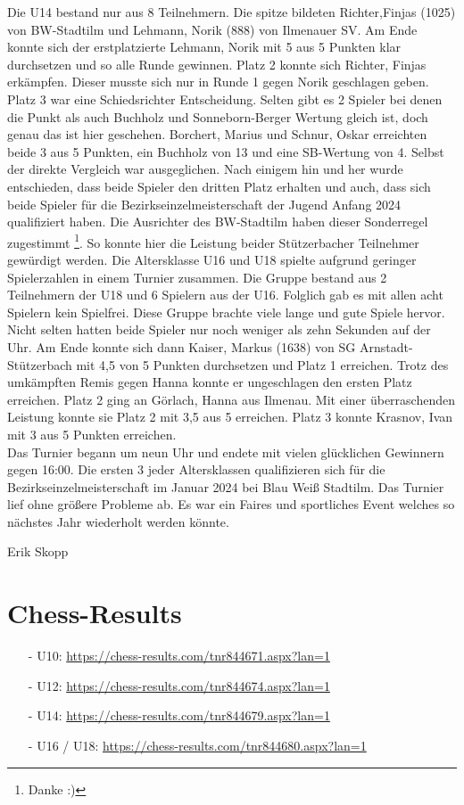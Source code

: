 \documentclass[a4paper,ngerman]{tui-algo-seminar}
\begin{document}
Die U14 bestand nur aus 8 Teilnehmern. 	Die spitze bildeten Richter,Finjas (1025) von BW-Stadtilm und Lehmann, Norik (888) von Ilmenauer SV. Am Ende konnte sich der erstplatzierte Lehmann, Norik mit 5 aus 5 Punkten klar durchsetzen und so alle Runde gewinnen. Platz 2 konnte sich Richter, Finjas erkämpfen. Dieser musste sich nur in Runde 1 gegen Norik geschlagen geben. Platz 3 war eine Schiedsrichter Entscheidung. Selten gibt es 2 Spieler bei denen die Punkt als auch Buchholz und Sonneborn-Berger Wertung gleich ist, doch genau das ist hier geschehen. Borchert, Marius und Schnur, Oskar erreichten beide 3 aus 5 Punkten, ein Buchholz von 13 und eine SB-Wertung von 4. Selbst der direkte Vergleich war ausgeglichen. Nach einigem hin und her wurde entschieden, dass beide Spieler den dritten Platz erhalten und auch, dass sich beide Spieler für die Bezirkseinzelmeisterschaft der Jugend Anfang 2024 qualifiziert haben. Die Ausrichter des BW-Stadtilm haben dieser Sonderregel zugestimmt \footnote{Danke :) }. So konnte hier die Leistung beider Stützerbacher Teilnehmer gewürdigt werden.
Die Altersklasse U16 und U18 spielte aufgrund geringer Spielerzahlen in einem Turnier zusammen. Die Gruppe bestand aus 2 Teilnehmern der U18 und 6 Spielern aus der U16. Folglich gab es mit allen acht Spielern kein Spielfrei. Diese Gruppe brachte viele lange und gute Spiele hervor. Nicht selten hatten beide Spieler nur noch weniger als zehn Sekunden auf der Uhr. Am Ende konnte sich dann Kaiser, Markus (1638) von SG Arnstadt-Stützerbach mit 4,5 von 5 Punkten durchsetzen und Platz 1 erreichen. Trotz des umkämpften Remis gegen Hanna konnte er ungeschlagen den ersten Platz erreichen. Platz 2 ging an Görlach, Hanna aus Ilmenau. Mit einer überraschenden Leistung konnte sie Platz 2 mit 3,5 aus 5 erreichen. Platz 3 konnte Krasnov, Ivan mit 3 aus 5 Punkten erreichen.\\
Das Turnier begann um neun Uhr und endete mit vielen glücklichen Gewinnern gegen 16:00. Die ersten 3 jeder Altersklassen qualifizieren sich für die Bezirkseinzelmeisterschaft im Januar 2024 bei Blau Weiß Stadtilm. Das Turnier lief ohne größere Probleme ab. Es war ein Faires und sportliches Event welches so nächstes Jahr wiederholt werden könnte. 

Erik Skopp
\cleardoublepage



\section{Chess-Results}
\begin{itemize}
	\item[-] U10: \url{https://chess-results.com/tnr844671.aspx?lan=1}
	\item[-] U12: \url{https://chess-results.com/tnr844674.aspx?lan=1}
	\item[-] U14: \url{https://chess-results.com/tnr844679.aspx?lan=1}
	\item[-] U16 / U18: \url{https://chess-results.com/tnr844680.aspx?lan=1}
\end{itemize}
\end{document}
